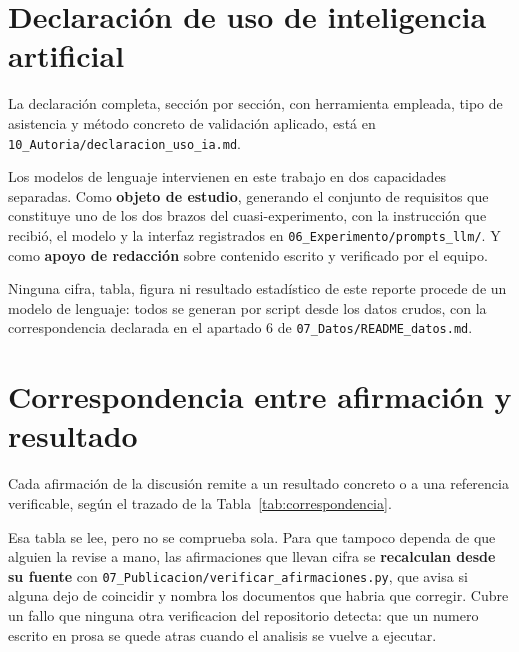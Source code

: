 \documentclass[11pt,a4paper]{article}
\begin{document}
\section{Declaraci\'on de uso de inteligencia artificial}
\label{anx:ia}

La declaraci\'on completa, secci\'on por secci\'on, con herramienta empleada, tipo de
asistencia y m\'etodo concreto de validaci\'on aplicado, est\'a en
\texttt{10\_Autoria/declaracion\_uso\_ia.md}.

Los modelos de lenguaje intervienen en este trabajo en dos capacidades separadas. Como
\textbf{objeto de estudio}, generando el conjunto de requisitos que constituye uno de
los dos brazos del cuasi-experimento, con la instrucci\'on que recibi\'o, el modelo y la interfaz
registrados en \texttt{06\_Experimento/prompts\_llm/}. Y como \textbf{apoyo de redacci\'on}
sobre contenido escrito y verificado por el equipo.

Ninguna cifra, tabla, figura ni resultado estad\'istico de este reporte procede de un
modelo de lenguaje: todos se generan por script desde los datos crudos, con la
correspondencia declarada en el apartado 6 de \texttt{07\_Datos/README\_datos.md}.

\section{Correspondencia entre afirmaci\'on y resultado}
\label{anx:correspondencia}

Cada afirmaci\'on de la discusi\'on remite a un resultado concreto o a una referencia
verificable, seg\'un el trazado de la Tabla~\ref{tab:correspondencia}.

Esa tabla se lee, pero no se comprueba sola. Para que tampoco dependa de que alguien la
revise a mano, las afirmaciones que llevan cifra se \textbf{recalculan desde su fuente} con
\nolinkurl{07_Publicacion/verificar_afirmaciones.py}, que avisa si alguna dejo de coincidir y
nombra los documentos que habria que corregir. Cubre un fallo que ninguna otra verificacion
del repositorio detecta: que un numero escrito en prosa se quede atras cuando el analisis se
vuelve a ejecutar.
\end{document}
